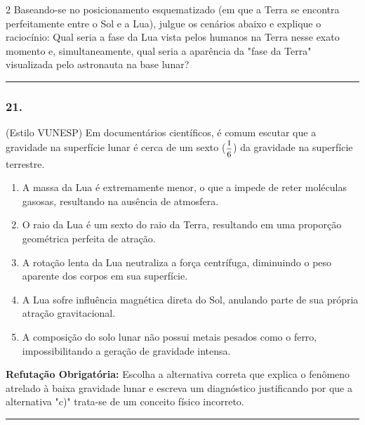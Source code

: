 \documentclass[twoside, 10pt, a4paper]{article}
\newlength{\espacoPreQuestao}
\newlength{\espacoQuestao}
\newlength{\espacoAlt}
\begin{document}
\begin{multicols*}{2}
Baseando-se no posicionamento esquematizado (em que a Terra se encontra perfeitamente entre o Sol e a Lua), julgue os cenários abaixo e explique o raciocínio:
Qual seria a fase da Lua vista pelos humanos na Terra nesse exato momento e, simultaneamente, qual seria a aparência da "fase da Terra" visualizada pelo astronauta na base lunar?
\par\vspace{\espacoQuestao}

\noindent\textcolor{CorLinha}{\rule{\linewidth}{0.5pt}} 
\par\vspace{\espacoPreQuestao}
\subsubsection*{21.} (Estilo VUNESP) Em documentários científicos, é comum escutar que a gravidade na superfície lunar é cerca de um sexto ($ \mfrac{1}{6} $) da gravidade na superfície terrestre.
\begin{enumerate}[label=\alph*), itemsep=\espacoAlt]
    \item A massa da Lua é extremamente menor, o que a impede de reter moléculas gasosas, resultando na ausência de atmosfera.
    \item O raio da Lua é um sexto do raio da Terra, resultando em uma proporção geométrica perfeita de atração.
    \item A rotação lenta da Lua neutraliza a força centrífuga, diminuindo o peso aparente dos corpos em sua superfície.
    \item A Lua sofre influência magnética direta do Sol, anulando parte de sua própria atração gravitacional.
    \item A composição do solo lunar não possui metais pesados como o ferro, impossibilitando a geração de gravidade intensa.
\end{enumerate}
\begin{boxdica}
\textbf{Refutação Obrigatória:} Escolha a alternativa correta que explica o fenômeno atrelado à baixa gravidade lunar e escreva um diagnóstico justificando por que a alternativa "c)" trata-se de um conceito físico incorreto.
\end{boxdica}
\par\vspace{\espacoQuestao}

\noindent\textcolor{CorLinha}{\rule{\linewidth}{0.5pt}} 
\par\vspace{\espacoPreQuestao}

\end{multicols*}
\end{document}
